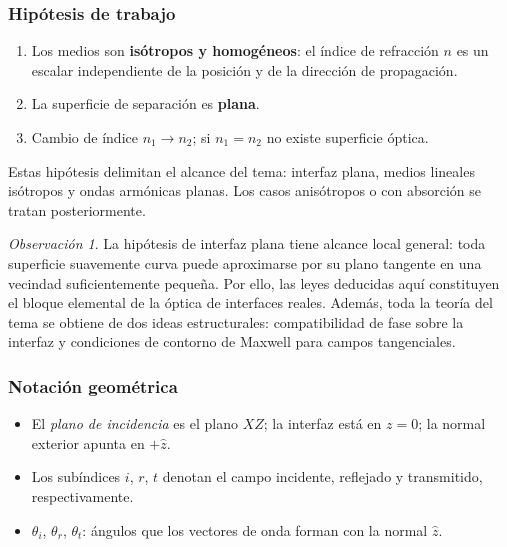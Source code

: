 \documentclass[12pt, a4paper]{article}
\theoremstyle{plain}
\theoremstyle{definition}
\theoremstyle{remark}
\newtheorem*{observacion}{Observación}
\newcommand{\uvec}[1]{\hat{#1}}
\begin{document}
\subsubsection*{Hipótesis de trabajo}

\begin{enumerate}
  \item Los medios son \textbf{isótropos y homogéneos}: el índice de refracción
        $n$ es un escalar independiente de la posición y de la dirección de
        propagación.
  \item La superficie de separación es \textbf{plana}.
  \item Cambio de índice $n_1 \to n_2$; si $n_1 = n_2$ no existe superficie
        óptica.
\end{enumerate}

Estas hipótesis delimitan el alcance del tema: interfaz plana, medios lineales
isótropos y ondas armónicas planas. Los casos anisótropos o con absorción se
tratan posteriormente.
\begin{observacion}
La hipótesis de interfaz plana tiene alcance local general: toda superficie
suavemente curva puede aproximarse por su plano tangente en una vecindad
suficientemente pequeña. Por ello, las leyes deducidas aquí constituyen el
bloque elemental de la óptica de interfaces reales. Además, toda la teoría del
tema se obtiene de dos ideas estructurales: compatibilidad de fase sobre la
interfaz y condiciones de contorno de Maxwell para campos tangenciales.
\end{observacion}

\subsubsection*{Notación geométrica}

\begin{itemize}
  \item El \emph{plano de incidencia} es el plano $XZ$; la interfaz está en
        $z = 0$; la normal exterior apunta en $+\uvec{z}$.
  \item Los subíndices $i$, $r$, $t$ denotan el campo incidente, reflejado
        y transmitido, respectivamente.
  \item $\theta_i$, $\theta_r$, $\theta_t$: ángulos que los vectores de onda
        forman con la normal $\uvec{z}$.
\end{itemize}
\end{document}
